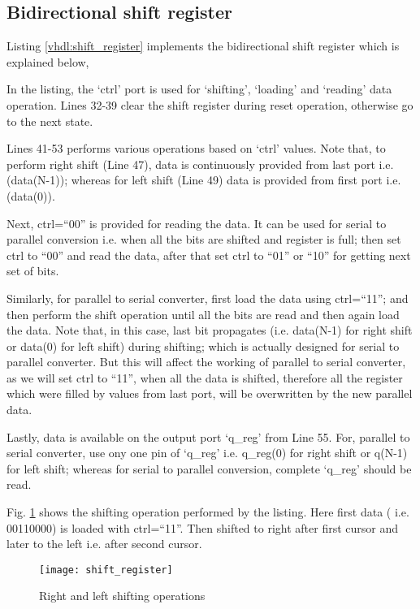 \subsection{Bidirectional shift register}
Listing \ref{vhdl:shift_register} implements the bidirectional shift register which is explained below, 

\begin{explanation}
	In the listing, the `ctrl' port is used for `shifting', `loading' and `reading' data operation. Lines 32-39 clear the shift register during reset operation, otherwise go to the next state. 
	
	Lines 41-53 performs various operations based on `ctrl' values. Note that, to perform right shift (Line 47), data is continuously provided from last port i.e. (data(N-1)); whereas for left shift (Line 49) data is provided from first port i.e. (data(0)). 
	
	Next, ctrl=``00'' is provided for reading the data. It can be used for serial to parallel conversion i.e. when all the bits are shifted and register is full; then set ctrl to ``00'' and read the data, after that set ctrl to ``01'' or ``10'' for getting next set of bits. 
	
	Similarly, for parallel to serial converter, first load the data using ctrl=``11''; and then perform the shift operation until all the bits are read and then again load the data. Note that, in this case, last bit propagates (i.e. data(N-1) for right shift or data(0) for left shift) during shifting; which is actually designed for serial to parallel converter. But this will affect the working of parallel to serial converter, as we will set ctrl to ``11'', when all the data is shifted, therefore all the register which were filled by values from last port, will be overwritten by the new parallel data. 
	
	Lastly, data is available on the output port `q\_reg' from Line 55. For, parallel to serial converter, use ony one pin of `q\_reg' i.e. q\_reg(0) for right shift or q(N-1) for left shift; whereas for serial to parallel conversion, complete  `q\_reg' should be read.
	
	Fig. \ref{fig:shift_register} shows the shifting operation performed by the listing. Here first data ( i.e. 00110000) is loaded with ctrl=``11''. Then shifted to right after first cursor and later to the left i.e. after second cursor.
	
	\begin{figure}[!h]
		\centering
		\texttt{[image: shift\_register]}
		\caption{Right and left shifting operations}
		\label{fig:shift_register}
	\end{figure}	 
\end{explanation}

